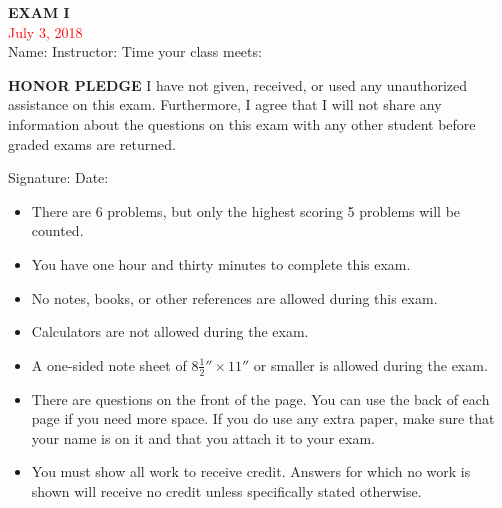 \documentclass[11pt]{article}
\begin{document}
\pagestyle{fancy}


\begin{center}
{\Large \bf {\sc EXAM I}} \\
\textcolor{red}{July 3, 2018} \\
\vspace{3mm}
Name: \underline{\hspace{5cm}} \hspace{3mm}
Instructor: \underline{\hspace{2cm}} \hspace{3mm}
Time your class meets: \underline{\hspace{1cm}}
\end{center}

\noindent
{\bf HONOR PLEDGE} \hspace{5mm} I have not given, received, or used any unauthorized assistance on this exam. Furthermore, I 
agree that I will not share any information about the questions on this exam with any other student before graded exams are returned. 
\noindent 
\begin{center}
Signature: \underline{\hspace{4cm}} Date: \underline{\hspace{3cm}} \hspace{5mm}
\end{center}

\begin{itemize}
\item There are 6 problems, but only the highest scoring 5 problems will be counted.
\item You have one hour and thirty minutes to complete this exam.
\item No notes, books, or other references are allowed during this exam.  
\item Calculators are not allowed during the exam.
\item A one-sided note sheet of $8\frac{1}{2}'' \times 11''$ or smaller is allowed during the exam. 
\item There are questions on the front of the page. You can use the back of each
page if you need more space. If you do use any extra paper, make sure that your name is 
on it and that you attach it to your exam.
\item You must show all work to receive credit. Answers for which no work is shown
will receive no credit unless specifically stated otherwise. 
\end{itemize}
\end{document}
